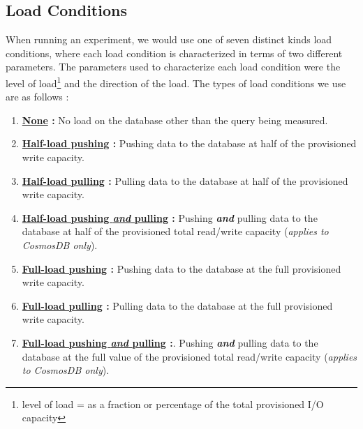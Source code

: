 \subsection{Load Conditions}

When running an experiment, we would use one of seven distinct kinds load conditions, where each load condition is characterized in terms of two different parameters.  The parameters used to characterize each load condition were the level of load\footnote{level of load = as a fraction or percentage of the total provisioned I/O capacity} and the direction of the load.  The types of load conditions we use are as follows :

\vspace{0.1in}
\begin{spacing}{1.2}
\begin{enumerate}[label=\large{\textbf{\Alph*}):}]
	\item \textbf{\underline{None} :} No load on the database other than the query being measured.
	\vspace{0.05in}
	\item \textbf{\underline{Half-load pushing} :} Pushing data to the database at half of the provisioned write capacity.
	\vspace{0.05in}
	\item \textbf{\underline{Half-load pulling} :} Pulling data to the database at half of the provisioned write capacity.
	\vspace{0.05in}
	\item \textbf{\underline{Half-load pushing \emph{and} pulling} :} Pushing \emph{\textbf{and}} pulling data to the database at half of the provisioned total read/write capacity (\emph{applies to CosmosDB only}).
	\vspace{0.05in}
	\item \textbf{\underline{Full-load pushing} :} Pushing data to the database at the full provisioned write capacity.
	\vspace{0.05in}
	\item \textbf{\underline{Full-load pulling} :} Pulling data to the database at the full provisioned write capacity.
	\vspace{0.05in}
	\item \textbf{\underline{Full-load pushing \emph{and} pulling} :}. Pushing \emph{\textbf{and}} pulling data to the database at the full value of the provisioned total read/write capacity (\emph{applies to CosmosDB only}).
\end{enumerate}
\end{spacing}
